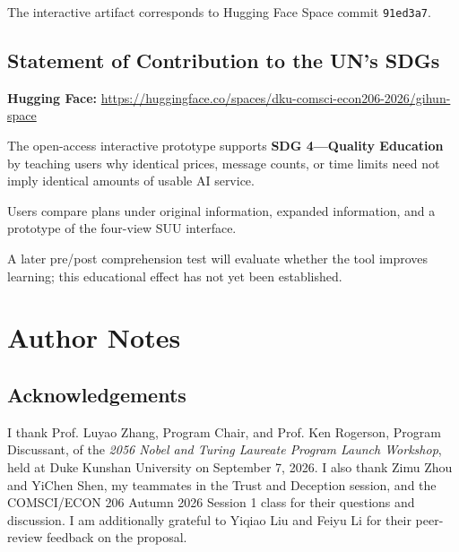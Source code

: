 \documentclass[sigconf,nonacm]{acmart}
\newcommand{\DemoLink}{
\url{https://huggingface.co/spaces/dku-comsci-econ206-2026/gihun-space}
}
\begin{document}
The interactive artifact corresponds to Hugging Face Space commit
\texttt{91ed3a7}.



\vspace{0.7em}

\subsection*{Statement of Contribution to the UN's SDGs}

\textbf{Hugging Face:} \DemoLink

\vspace{0.4em}

The open-access interactive prototype supports
\textbf{SDG 4---Quality Education}~\cite{sdg4}
by teaching users why identical prices,
message counts,
or time limits need not imply identical amounts of usable AI service.

Users compare plans under original information,
expanded information,
and a prototype of the four-view SUU interface.

A later pre/post comprehension test will evaluate whether the tool improves
learning; this educational effect has not yet been established.



\clearpage
\nobalance

\section*{Author Notes}

\subsection*{Acknowledgements}

I thank Prof. Luyao Zhang, Program Chair,
and Prof. Ken Rogerson, Program Discussant,
of the \emph{2056 Nobel and Turing Laureate Program Launch Workshop},
held at Duke Kunshan University on September 7, 2026.
I also thank Zimu Zhou and YiChen Shen,
my teammates in the Trust and Deception session,
and the COMSCI/ECON 206 Autumn 2026 Session 1 class
for their questions and discussion.
I am additionally grateful to Yiqiao Liu and Feiyu Li
for their peer-review feedback on the proposal.
\end{document}
